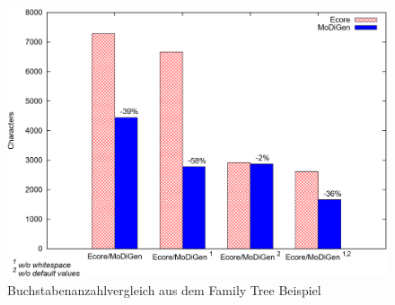 \begin{figure}
\centering
\includegraphics[width=\linewidth]{Abschnitte/Abbildungen/Grafiken/Num-Char-Family-Tree-Model}
\caption{Buchstabenanzahlvergleich aus dem Family Tree Beispiel}
\label{fig:Num-Char-Family-Tree-Model}
\end{figure}